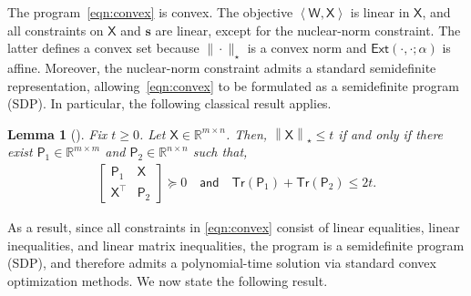 \documentclass[12pt]{article}
\newtheorem{lemma}{Lemma}
\newcommand{\norm}[1]{\left\|#1\right\|}
\newcommand{\innerP}[1]{\left\langle#1\right\rangle}
\newcommand{\s}[1]{\mathsf{#1}}
\begin{document}
The program~\eqref{eqn:convex} is convex. The objective $\innerP{\s{W},\s{X}}$ is linear in $\s{X}$, and all constraints on $\s{X}$ and $\mathbf{s}$ are linear, except for the nuclear-norm constraint. The latter defines a convex set because $\|\cdot\|_\star$ is a convex norm and $\s{Ext}(\cdot,\cdot;\alpha)$ is affine. Moreover, the nuclear-norm constraint admits a standard semidefinite representation, allowing~\eqref{eqn:convex} to be formulated as a semidefinite program (SDP). In particular, the following classical result applies.
\begin{lemma}[{\cite[Lemma 2]{fazel2002matrix}}]
 Fix $t\geq0$. Let $\s{X} \in \mathbb{R}^{m\times n}$. Then, $\norm{\s{X}}_\star \leq t$ if and only if there exist $\s{P}_1 \in \mathbb{R}^{m \times m}$ and $\s{P}_2 \in \mathbb{R}^{n \times n}$ such that,
    \begin{align}
\begin{bmatrix}
\s{P}_1 & \s{X} \\
\s{X}^\top & \s{P}_2
\end{bmatrix} \succeq 0 \quad \s{and} \quad \s{Tr}(\s{P}_1) + \s{Tr}(\s{P}_2) \leq 2t.\label{eqn:ccooc}
\end{align}
\end{lemma}
As a result, since all constraints in \eqref{eqn:convex} consist of linear equalities, linear inequalities, and linear matrix inequalities, the program is a semidefinite program (SDP), and therefore admits a polynomial-time solution via standard convex optimization methods. We now state the following result.
\end{document}

